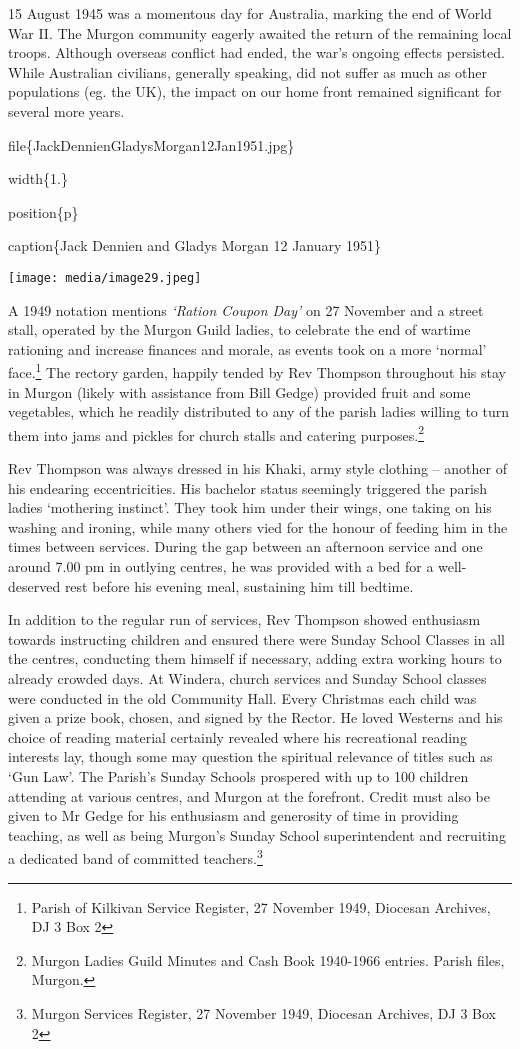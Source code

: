 15 August 1945 was a momentous day for Australia, marking the end of World War II. The Murgon community eagerly awaited the return of the remaining local troops. Although overseas conflict had ended, the war's ongoing effects persisted. While Australian civilians, generally speaking, did not suffer as much as other populations (eg. the UK), the impact on our home front remained significant for several more years.

file\{JackDennienGladysMorgan12Jan1951.jpg\}

width\{1.\}

position\{p\}

caption\{Jack Dennien and Gladys Morgan 12 January 1951\}

\texttt{[image: media/image29.jpeg]}

A 1949 notation mentions \emph{`Ration Coupon Day'} on 27 November and a street stall, operated by the Murgon Guild ladies, to celebrate the end of wartime rationing and increase finances and morale, as events took on a more `normal' face.\footnote{Parish of Kilkivan Service Register, 27 November 1949, Diocesan Archives, DJ 3 Box 2} The rectory garden, happily tended by Rev Thompson throughout his stay in Murgon (likely with assistance from Bill Gedge) provided fruit and some vegetables, which he readily distributed to any of the parish ladies willing to turn them into jams and pickles for church stalls and catering purposes.\footnote{Murgon Ladies Guild Minutes and Cash Book 1940-1966 entries. Parish files, Murgon.}

Rev Thompson was always dressed in his Khaki, army style clothing -- another of his endearing eccentricities. His bachelor status seemingly triggered the parish ladies `mothering instinct'. They took him under their wings, one taking on his washing and ironing, while many others vied for the honour of feeding him in the times between services. During the gap between an afternoon service and one around 7.00 pm in outlying centres, he was provided with a bed for a well-deserved rest before his evening meal, sustaining him till bedtime.

In addition to the regular run of services, Rev Thompson showed enthusiasm towards instructing children and ensured there were Sunday School Classes in all the centres, conducting them himself if necessary, adding extra working hours to already crowded days. At Windera, church services and Sunday School classes were conducted in the old Community Hall. Every Christmas each child was given a prize book, chosen, and signed by the Rector. He loved Westerns and his choice of reading material certainly revealed where his recreational reading interests lay, though some may question the spiritual relevance of titles such as `Gun Law'. The Parish's Sunday Schools prospered with up to 100 children attending at various centres, and Murgon at the forefront. Credit must also be given to Mr Gedge for his enthusiasm and generosity of time in providing teaching, as well as being Murgon's Sunday School superintendent and recruiting a dedicated band of committed teachers.\footnote{Murgon Services Register, 27 November 1949, Diocesan Archives, DJ 3 Box 2}

